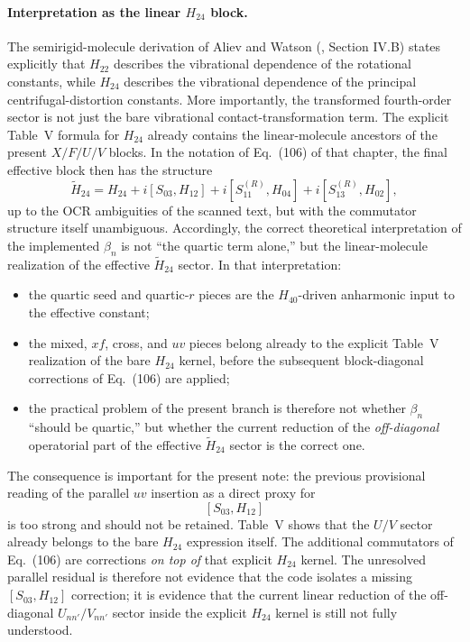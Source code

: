 \documentclass[11pt]{article}
\begin{document}
\paragraph{Interpretation as the linear \texorpdfstring{$H_{24}$}{H24} block.}
The semirigid-molecule derivation of Aliev and Watson
(,
Section IV.B) states explicitly that $H_{22}$ describes the vibrational
dependence of the rotational constants, while $H_{24}$ describes the
vibrational dependence of the principal centrifugal-distortion constants.
More importantly, the transformed fourth-order sector is not just the bare
vibrational contact-transformation term. The explicit Table~V formula for
$H_{24}$ already contains the linear-molecule ancestors of the present
$X/F/U/V$ blocks. In the notation of Eq.~(106) of that chapter, the final
effective block then has the structure
\[
\widetilde H_{24}
=
H_{24}
+ i[S_{03},H_{12}]
+ i[S^{(R)}_{11},H_{04}]
+ i[S^{(R)}_{13},H_{02}],
\]
up to the OCR ambiguities of the scanned text, but with the commutator
structure itself unambiguous. Accordingly, the correct theoretical
interpretation of the implemented $\beta_n$ is not ``the quartic term
alone,'' but the linear-molecule realization of the effective
$\widetilde H_{24}$ sector. In that interpretation:
\begin{itemize}
\item the quartic seed and quartic-$r$ pieces are the $H_{40}$-driven anharmonic
input to the effective constant;
\item the mixed, $xf$, cross, and $uv$ pieces belong already to the explicit
Table~V realization of the bare $H_{24}$ kernel, before the subsequent
block-diagonal corrections of Eq.~(106) are applied;
\item the practical problem of the present branch is therefore not whether
$\beta_n$ ``should be quartic,'' but whether the current reduction of the
\emph{off-diagonal} operatorial part of the effective $\widetilde H_{24}$
sector is the correct one.
\end{itemize}

The consequence is important for the present note: the previous provisional
reading of the parallel $uv$ insertion as a direct proxy for
\[
[S_{03},H_{12}]
\]
is too strong and should not be retained. Table~V shows that the $U/V$ sector
already belongs to the bare $H_{24}$ expression itself. The additional
commutators of Eq.~(106) are corrections \emph{on top of} that explicit
$H_{24}$ kernel. The unresolved parallel residual is therefore not evidence
that the code isolates a missing $[S_{03},H_{12}]$ correction; it is evidence
that the current linear reduction of the off-diagonal $U_{nn'}/V_{nn'}$
sector inside the explicit $H_{24}$ kernel is still not fully understood.
\end{document}
